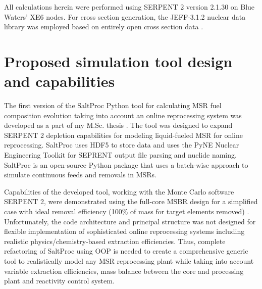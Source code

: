 All calculations herein were performed using SERPENT 2 version 2.1.30 on Blue Waters’ XE6 nodes. For cross section generation, the JEFF-3.1.2 nuclear data library was employed based on entirely open cross section data 
\cite{oecd/nea_data_bank_jeff-3.1.2_2014}. 

\section{Proposed simulation tool design and capabilities} \label{sec:tool_design}
The first version of the SaltProc Python tool for calculating \gls{MSR} fuel 
composition evolution taking into account an online reprocessing system 
was developed as a part of my M.Sc. thesis \cite{rykhlevskii_advanced_2018,
rykhlevskii_arfc/saltproc_2018}. The tool was designed to 
expand SERPENT 2 depletion capabilities for modeling liquid-fueled \gls{MSR} 
for online reprocessing. SaltProc uses HDF5 
\cite{the_hdf_group_hierarchical_1997} to store 
data and uses the PyNE Nuclear Engineering Toolkit \cite{scopatz_pyne_2012}
for SEPRENT output file parsing and nuclide naming. SaltProc is an 
open-source Python package that uses a batch-wise approach to simulate 
continuous feeds and removals in \glspl{MSR}. 

Capabilities of the developed tool, working with the Monte Carlo software 
SERPENT 2, were demonstrated using the full-core MSBR design for a 
simplified case with ideal removal efficiency (100\% of mass for target 
elements removed) \cite{rykhlevskii_modeling_2019}. Unfortunately, 
the code architecture and principal structure was not designed for 
flexible implementation of sophisticated online reprocessing systems 
including realistic physics/chemistry-based extraction efficiencies. 
Thus, complete refactoring of SaltProc using \gls{OOP} is needed to 
create a comprehensive generic tool to realistically model any \gls{MSR} 
reprocessing plant while taking into account variable extraction 
efficiencies, mass balance between the core and processing plant and 
reactivity control system.

